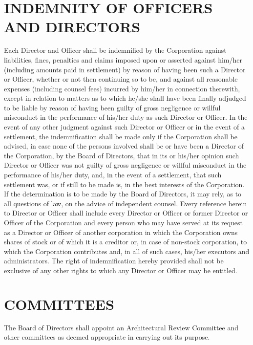 \documentclass[12pt, letterpaper]{article}
\begin{document}
\section{INDEMNITY OF OFFICERS AND DIRECTORS}
Each Director and Officer shall be indemnified by the Corporation against liabilities, fines, penalties and claims imposed upon or asserted against him/her (including amounts paid in settlement) by reason of having been such a Director or Officer, whether or not then continuing so to be, and against all reasonable expenses (including counsel fees) incurred by him/her in connection therewith, except in relation to matters as to which he/she shall have been finally adjudged to be liable by reason of having been guilty of gross negligence or willful misconduct in the performance of his/her duty as such Director or Officer.
In the event of any other judgment against such Director or Officer or in the event of a settlement, the indemnification shall be made only if the Corporation shall be advised, in case none of the persons involved shall be or have been a Director of the Corporation, by the Board of Directors, that in its or his/her opinion such Director or Officer was not guilty of gross negligence or willful misconduct in the performance of his/her duty, and, in the event of a settlement, that such settlement was, or if still to be made is, in the best interests of the Corporation.
If the determination is to be made by the Board of Directors, it may rely, as to all questions of law, on the advice of independent counsel.
Every reference herein to Director or Officer shall include every Director or Officer or former Director or Officer of the Corporation and every person who may have served at its request as a Director or Officer of another corporation in which the Corporation owns shares of stock or of which it is a creditor or, in case of non-stock corporation, to which the Corporation contributes and, in all of such cases, his/her executors and administrators.
The right of indemnification hereby provided shall not be exclusive of any other rights to which any Director or Officer may be entitled.

\section{COMMITTEES}
The Board of Directors shall appoint an Architectural Review Committee and other committees as deemed appropriate in carrying out its purpose.
\end{document}
